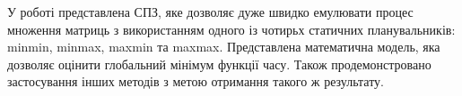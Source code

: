 
У роботі представлена СПЗ, яке дозволяє дуже швидко емулювати процес множення матриць з використанням одного із чотирьх статичних планувальників: minmin, minmax, maxmin та maxmax. Представлена математична модель, яка дозволяє оцінити глобальний мінімум функції часу. Також продемонстровано застосування інших методів з метою отримання такого ж результату.